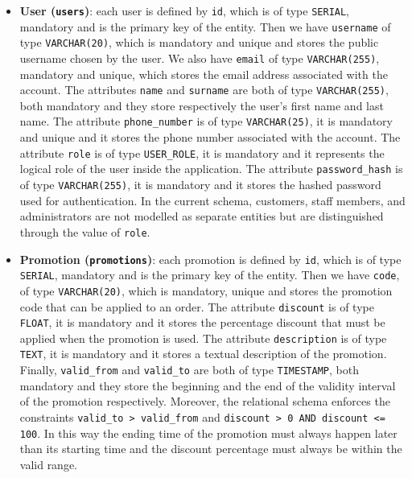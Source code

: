 \begin{itemize}
    \item \textbf{User (\texttt{users})}: each user is defined by \texttt{id}, which is of type \texttt{SERIAL}, mandatory and is the primary key of the entity. Then we have \texttt{username} of type \texttt{VARCHAR(20)}, which is mandatory and unique and stores the public username chosen by the user. We also have \texttt{email} of type \texttt{VARCHAR(255)}, mandatory and unique, which stores the email address associated with the account. The attributes \texttt{name} and \texttt{surname} are both of type \texttt{VARCHAR(255)}, both mandatory and they store respectively the user's first name and last name. The attribute \texttt{phone\_number} is of type \texttt{VARCHAR(25)}, it is mandatory and unique and it stores the phone number associated with the account. The attribute \texttt{role} is of type \texttt{USER\_ROLE}, it is mandatory and it represents the logical role of the user inside the application. The attribute \texttt{password\_hash} is of type \texttt{VARCHAR(255)}, it is mandatory and it stores the hashed password used for authentication. In the current schema, customers, staff members, and administrators are not modelled as separate entities but are distinguished through the value of \texttt{role}.
    
    \item \textbf{Promotion (\texttt{promotions})}: each promotion is defined by \texttt{id}, which is of type \texttt{SERIAL}, mandatory and is the primary key of the entity. Then we have \texttt{code}, of type \texttt{VARCHAR(20)}, which is mandatory, unique and stores the promotion code that can be applied to an order. The attribute \texttt{discount} is of type \texttt{FLOAT}, it is mandatory and it stores the percentage discount that must be applied when the promotion is used. The attribute \texttt{description} is of type \texttt{TEXT}, it is mandatory and it stores a textual description of the promotion. Finally, \texttt{valid\_from} and \texttt{valid\_to} are both of type \texttt{TIMESTAMP}, both mandatory and they store the beginning and the end of the validity interval of the promotion respectively. Moreover, the relational schema enforces the constraints \texttt{valid\_to > valid\_from} and \texttt{discount > 0 AND discount <= 100}. In this way the ending time of the promotion must always happen later than its starting time and the discount percentage must always be within the valid range.


\end{itemize}

